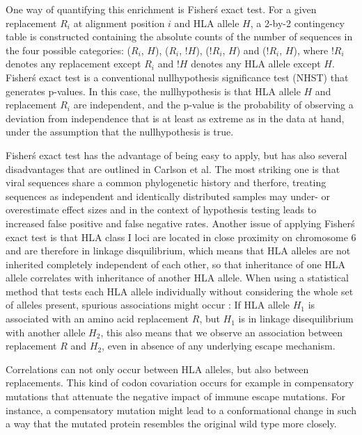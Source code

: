 \documentclass[fleqn,11pt]{SelfArx} %
\begin{document}
One way of quantifying this enrichment is Fisher\'s exact test.
For a given replacement \(R_{i}\) at alignment position \(i\) and HLA allele \(H\),
a 2-by-2 contingency table is constructed containing the absolute counts of the
number of sequences in the four possible categories: 
(\(R_{i}\), \(H\)), (\(R_{i}\), \(!H\)), (\(!R_{i}\), \(H\)) and (\(!R_{i}\), \(H\)),
where \(!R_{i}\) denotes any replacement except \(R_{i}\) and \(!H\) denotes any HLA allele
except \(H\).
Fisher\'s exact test is a conventional nullhypothesis significance test (NHST) that
generates p-values. In this case, the nullhypothesis is that HLA allele \(H\) and 
replacement \(R_{i}\) are independent, and the p-value is the probability of
observing a deviation from independence that is at least as extreme as in the data at hand,
under the assumption that the nullhypothesis is true.

Fisher\'s exact test has the advantage of being easy to apply, but has also several 
disadvantages that are outlined in Carlson et al.
The most striking one is that viral sequences share a common phylogenetic history and therfore,
treating sequences as independent and identically distributed samples may under- or
overestimate effect sizes and in the context of hypothesis testing leads to
increased false positive and false negative rates.
Another issue of applying Fisher\'s exact test is that HLA class I loci are located in
close proximity on chromosome 6 and are therefore in linkage disquilibrium, which means 
that HLA alleles are not inherited completely independent of each other, so that
inheritance of one HLA allele correlates with inheritance of another HLA allele.
When using a statistical method that tests each HLA allele individually without
considering the whole set of alleles present, spurious associations might occur
: If HLA allele \(H_{1}\) is associated with an amino acid replacement \(R\), but
\(H_{1}\) is in linkage disequilibrium with another allele \(H_{2}\), this also means that
we observe an association between replacement \(R\) and \(H_{2}\), even in
absence of any underlying escape mechanism.

Correlations can not only occur between HLA alleles, but also between replacements.
This kind of codon covariation occurs for example in compensatory mutations that
attenuate the negative impact of immune escape mutations. For instance,
a compensatory mutation might lead to a conformational change in such a way that
the mutated protein resembles the original wild type more closely.
\end{document}
